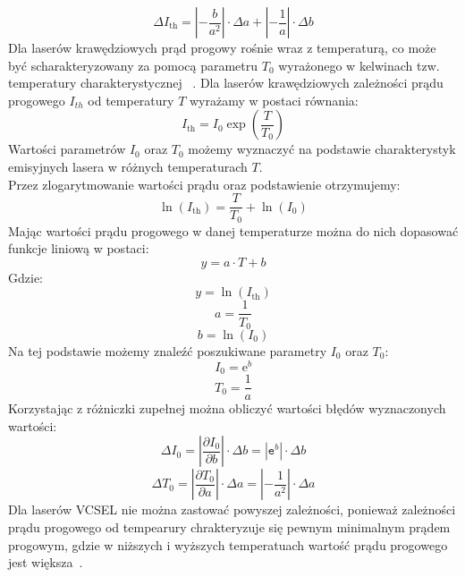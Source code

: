 \begin{equation}
\Delta I_{\mathrm{th}} = \left\lvert -\frac{b}{a^2} \right\rvert \cdot \Delta a + \left\lvert -\frac{1}{a} \right\rvert \cdot \Delta b
\end{equation}
Dla laserów krawędziowych prąd progowy rośnie wraz z temperaturą, co może być scharakteryzowany za pomocą parametru
$T_{0}$ wyrażonego w kelwinach tzw. temperatury charakterystycznej ~\cite{opto_book}.
Dla laserów krawędziowych zależności prądu progowego $I_{th}$ od temperatury $T$ wyrażamy w postaci równania:
\begin{equation}
I_{\mathrm{th}} = I_0 \exp \left( \frac{T}{T_0} \right)
\end{equation}
Wartości parametrów $I_0$ oraz $T_0$ możemy wyznaczyć na podstawie charakterystyk
emisyjnych lasera w różnych temperaturach $T$. \\
Przez zlogarytmowanie wartości prądu oraz podstawienie otrzymujemy:
\begin{equation}
\ln(I_{\mathrm{th}}) =    \frac{T}{T_0}  + \ln(I_0)
\end{equation}
Mając wartości prądu progowego w danej temperaturze  można do nich dopasować funkcje liniową w postaci:
\begin{equation}
y = a \cdot T + b
\end{equation}
Gdzie:
\begin{equation}
y = \ln(I_{\mathrm{th}})
\end{equation}
\begin{equation}
a = \frac{1}{T_0}
\end{equation}
\begin{equation}
b = \ln(I_0)
\end{equation}
Na tej podstawie możemy znaleźć poszukiwane parametry $I_0$ oraz $T_0$:
\begin{equation}
I_0 = \mathrm{e}^b
\end{equation}
\begin{equation}
T_0 = \frac{1}{a}
\end{equation}
Korzystając z różniczki zupełnej można obliczyć wartości błędów wyznaczonych wartości:
\begin{equation}
\Delta I_0 = \left\lvert \frac{\partial I_{0}}{\partial b} \right\rvert \cdot \Delta b = | \mathtt{e}^b | \cdot \Delta b
\end{equation}
\begin{equation}
\Delta T_0 = \left\lvert \frac{\partial T_{0}}{\partial a} \right\rvert \cdot \Delta a = \left\lvert -\frac{1}{a^2} \right\rvert \cdot \Delta a
\end{equation}
Dla laserów VCSEL nie można zastować powyszej zależności, ponieważ zależności prądu progowego od tempearury chrakteryzuje się pewnym
 minimalnym prądem progowym, gdzie w niższych i wyższych temperatuach wartość prądu progowego jest większa~\cite{publikacja_1}.
